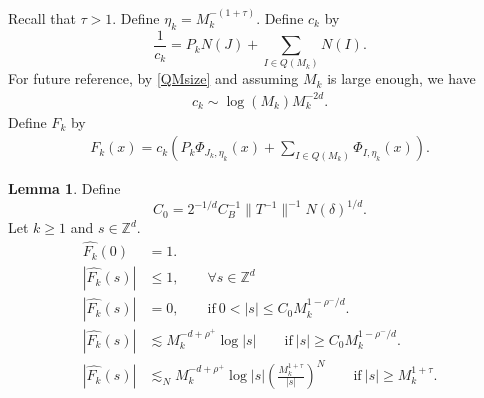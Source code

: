 \documentclass{amsart}
\numberwithin{equation}{section}
\theoremstyle{definition}
\newtheorem{lemma}[theorem]{Lemma}
\theoremstyle{definition}
\def\P{P}
\def\ZZ{\mathbb{Z}}
\newcommand{\rbr}[1]{\left( {#1} \right)}
\begin{document}
Recall that  $\tau > 1$. Define $\eta_k  = M_k^{-(1+\tau)}$. 
%
%
Define $c_k$ by 
$$
\dfrac{1}{c_k}  = \P_k N(J) + \sum_{I \in Q(M_k)}  N(I).
$$
For future reference, by \eqref{QMsize} and assuming $M_k$ is large enough, we have 
\begin{align}\label{ck size}
c_k \sim \log(M_k) M_k^{-2d}. 
\end{align}
%
Define $F_k$ by 
\begin{align}\label{Fk defn}
F_k(x) 
= c_k 
\rbr{ 
\P_k \Phi_{J_k,\eta_k}(x) + \sum_{I \in Q(M_k)} \Phi_{I,\eta_k}(x)  
}. 
\end{align}



\begin{lemma}\label{Fk fourier lemma}
Define 
$$
C_0 = 2^{-1/d}C_B^{-1} \|T^{-1}\|^{-1} N(\delta)^{1/d}. 
$$
Let $k \geq 1$ and $s \in \ZZ^d$. 
\begin{align}
\label{F-1*}
\widehat{F_k}(0) &= 1.  
\\
\label{F-2*}
|\widehat{F_k}(s)| &\leq 1, \qquad \forall s \in \ZZ^d 
\\
\label{F-3*}
|\widehat{F_k}(s)| &=0, \qquad \text{if} \  0 < |s| \leq 
C_0 M_k^{1-\rho^{-}/d}.
\\
\label{F-4*}
|\widehat{F_k}(s)|
&\lesssim M_k^{-d+\rho^+} 
\log|s| \qquad \text{if} \ |s| 
\geq 
C_0 M_k^{1-\rho^{-}/d}.
\\
\label{F-5*}
|\widehat{F_k}(s)|
&\lesssim_N  
M_k^{-d+\rho^+}
\log |s| \left(\frac{M_k^{1+\tau}}{|s|} \right)^N \qquad \text{if} \ |s| \geq M_k^{1+\tau}. 
\end{align}
\end{lemma}
\end{document}
